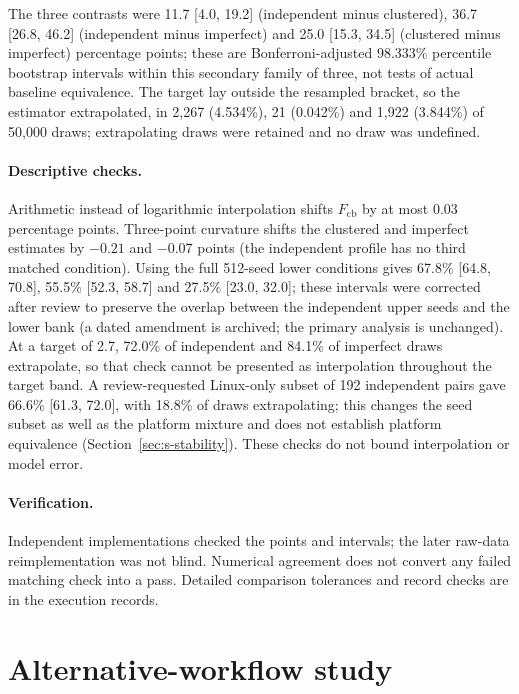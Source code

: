 \documentclass[11pt]{article}
\newcommand{\mn}{\ensuremath{-}}
\begin{document}
The three contrasts were 11.7 [4.0, 19.2] (independent minus clustered), 36.7
[26.8, 46.2] (independent minus imperfect) and 25.0 [15.3, 34.5] (clustered minus
imperfect) percentage points; these are Bonferroni-adjusted 98.333\% percentile
bootstrap intervals within this secondary family of three, not tests of actual
baseline equivalence. The target lay outside the resampled bracket, so the
estimator extrapolated, in 2,267 (4.534\%), 21 (0.042\%) and 1,922 (3.844\%) of
50,000 draws; extrapolating draws were retained and no draw was undefined.

\paragraph{Descriptive checks.} Arithmetic instead of logarithmic interpolation
shifts $F_{\mathrm{cb}}$ by at most 0.03 percentage points. Three-point curvature shifts the
clustered and imperfect estimates by $\mn0.21$ and $\mn0.07$ points (the
independent profile has no third matched condition). Using the full 512-seed
lower conditions gives 67.8\% [64.8, 70.8], 55.5\% [52.3, 58.7] and 27.5\% [23.0,
32.0]; these intervals were corrected after review to preserve the overlap
between the independent upper seeds and the lower bank (a dated amendment is
archived; the primary analysis is unchanged). At a target of 2.7, 72.0\% of
independent and 84.1\% of imperfect draws extrapolate, so that check cannot be
presented as interpolation throughout the target band. A review-requested
Linux-only subset of 192 independent pairs gave 66.6\% [61.3, 72.0], with 18.8\%
of draws extrapolating; this changes the seed subset as well as the platform
mixture and does not establish platform equivalence
(Section~\ref{sec:s-stability}). These checks do not bound interpolation or
model error.

\paragraph{Verification.} Independent implementations checked the points and
intervals; the later raw-data reimplementation was not blind. Numerical
agreement does not convert any failed matching check into a pass. Detailed
comparison tolerances and record checks are in the execution records.

\section{Alternative-workflow study}\label{sec:s-alternative}
\end{document}
